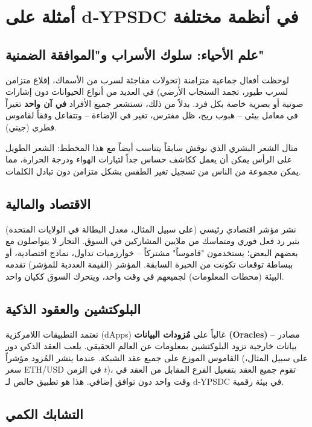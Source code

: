 \documentclass[11pt,a4paper]{article}
\begin{document}
	\section{أمثلة على d‑YPSDC في أنظمة مختلفة}
	
	\subsection{علم الأحياء: سلوك الأسراب و"الموافقة الضمنية"}
	
	لوحظت أفعال جماعية متزامنة (تحولات مفاجئة لسرب من الأسماك، إقلاع متزامن لسرب طيور، تجمد السنجاب الأرضي) في العديد من أنواع الحيوانات دون إشارات صوتية أو بصرية خاصة بكل فرد. بدلاً من ذلك، تستشعر جميع الأفراد \textbf{في آن واحد} تغيراً في معامل بيئي – هبوب ريح، ظل مفترس، تغير في الإضاءة – وتتفاعل وفقاً لقاموس فطري (جيني).
	
	مثال الشعر البشري الذي نوقش سابقاً يتناسب أيضاً مع هذا المخطط: الشعر الطويل على الرأس يمكن أن يعمل ككاشف حساس جداً لتيارات الهواء ودرجة الحرارة، مما يمكن مجموعة من الناس من تسجيل تغير الطقس بشكل متزامن دون تبادل الكلمات.
	
	\subsection{الاقتصاد والمالية}
	
	نشر مؤشر اقتصادي رئيسي (على سبيل المثال، معدل البطالة في الولايات المتحدة) يثير رد فعل فوري ومتماسك من ملايين المشاركين في السوق. التجار لا يتواصلون مع بعضهم البعض؛ يستخدمون "قاموساً" مشتركاً – خوارزميات تداول، نماذج اقتصادية، أو ببساطة توقعات تكونت من الخبرة السابقة. المؤشر (القيمة العددية للمؤشر) تقدمه البيئة (محطات المعلومات) لجميعهم في وقت واحد، ويتحرك السوق ككيان واحد.
	
	\subsection{البلوكتشين والعقود الذكية}
	
	تعتمد التطبيقات اللامركزية (dApps) غالباً على \textbf{مُزودات البيانات (Oracles)} – مصادر بيانات خارجية تزود البلوكتشين بمعلومات عن العالم الحقيقي. يلعب العقد الذكي دور القاموس الموزع على جميع عقد الشبكة. عندما ينشر المُزود مؤشراً (على سبيل المثال، سعر ETH/USD في الزمن \(t\))، تقوم جميع العقد بتفعيل الفرع المقابل من العقد في وقت واحد دون توافق إضافي. هذا هو تطبيق خالص لـ d‑YPSDC في بيئة رقمية.
	
	\subsection{التشابك الكمي}
	
\end{document}
